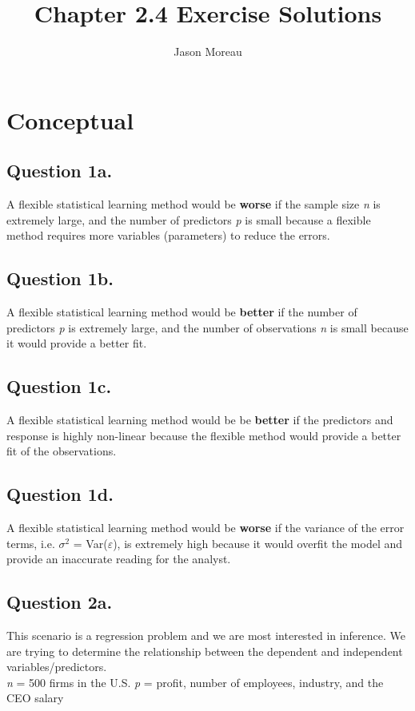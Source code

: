 \documentclass{article}
\title{Chapter 2.4 Exercise Solutions}
\author{Jason Moreau}
\begin{document}
\maketitle
\section*{Conceptual}


\subsection*{Question 1a.}
A flexible statistical learning method would be \textbf{worse} if the sample size \textit{n} is extremely large, and the number of predictors \textit{p} is small because a flexible method requires more variables (parameters) to reduce the errors.

\subsection*{Question 1b.}
A flexible statistical learning method would be \textbf{better} if the number of predictors \textit{p} is extremely large, and the number of observations \textit{n} is small because it would provide a better fit.

\subsection*{Question 1c.}
A flexible statistical learning method would be be \textbf{better} if the predictors and response is highly non-linear because the flexible method would provide a better fit of the observations.

\subsection*{Question 1d.}
A flexible statistical learning method would be \textbf{worse} if the variance of the error terms, i.e. $\sigma^{2}$ = Var($\varepsilon$), is extremely high because it would overfit the model and provide an inaccurate reading for the analyst.

\subsection*{Question 2a.}
This scenario is a regression problem and we are most interested in inference. We are trying to determine the relationship between the dependent and independent variables/predictors. \\
\newline
\textit{n} = 500 firms in the U.S. \newline
\textit{p} = profit, number of employees, industry, and the CEO salary 
\end{document}
